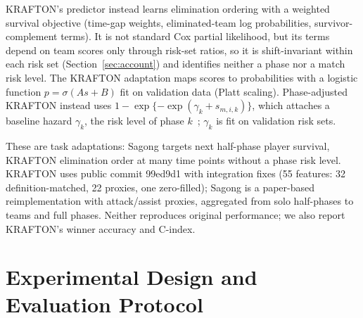 \documentclass[sigconf,anonymous]{acmart}
\begin{document}
KRAFTON's predictor instead learns elimination ordering with a weighted survival objective (time-gap weights, eliminated-team log probabilities, survivor-complement terms). It is not standard Cox partial likelihood, but its terms depend on team scores only through risk-set ratios, so it is shift-invariant within each risk set (Section~\ref{sec:account}) and identifies neither a phase nor a match risk level. The KRAFTON adaptation maps scores to probabilities with a logistic function $p=\sigma(A s+B)$ fit on validation data (Platt scaling). Phase-adjusted KRAFTON instead uses $1-\exp\{-\exp(\gamma_k+s_{m,i,k})\}$, which attaches a baseline hazard $\gamma_k$, the risk level of phase $k$~\cite{PrenticeGloeckler78}; $\gamma_k$ is fit on validation risk sets.

These are task adaptations: Sagong targets next half-phase player survival, KRAFTON elimination order at many time points without a phase risk level. KRAFTON uses public commit 99ed9d1 with integration fixes (55 features: 32 definition-matched, 22 proxies, one zero-filled); Sagong is a paper-based reimplementation with attack/assist proxies, aggregated from solo half-phases to teams and full phases. Neither reproduces original performance; we also report KRAFTON's winner accuracy and C-index.

\section{Experimental Design and Evaluation Protocol}
\label{sec:method:evaluation}
\end{document}
